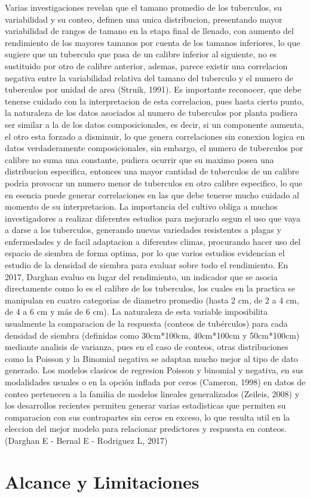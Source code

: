 Varias investigaciones revelan que el tamano promedio de los tuberculos, su variabilidad y su conteo, definen una unica distribucion, presentando mayor variabilidad de rangos de tamano en la etapa final de llenado, con aumento del rendimiento de los mayores tamanos por cuenta de los tamanos inferiores, lo que sugiere que un tuberculo que pasa de un calibre inferior al siguiente, no es sustituido por otro de calibre anterior, ademas, parece existir una correlacion negativa entre la variabilidad relativa del tamano del tuberculo y el numero de tuberculos por unidad de area (Struik, 1991). Es importante reconocer, que debe tenerse cuidado con la interpretacion de esta correlacion, pues hasta cierto punto, la naturaleza de los datos asociados al numero de tuberculos por planta pudiera ser similar a la de los datos composicionales, es decir, si un componente aumenta, el otro esta forzado a disminuir, lo que genera correlaciones sin conexion logica en datos verdaderamente composicionales, sin embargo, el numero de tuberculos por calibre no suma una constante, pudiera ocurrir que su maximo posea una distribucion especifica, entonces una mayor cantidad de tuberculos de un calibre podria provocar un numero menor de tuberculos en otro calibre especifico, lo que en esencia puede generar correlaciones en las que debe tenerse mucho cuidado al momento de su interpretacion. La importancia del cultivo obliga a muchos investigadores a realizar diferentes estudios para mejorarlo segun el uso que vaya a darse a los tuberculos, generando nuevas variedades resistentes a plagas y enfermedades y de facil adaptacion a diferentes climas, procurando hacer uso del espacio de siembra de forma optima, por lo que varios estudios evidencian el estudio de la densidad de siembra para evaluar sobre todo el rendimiento. En 2017, Darghan evaluo en lugar del rendimiento, un indicador que se asocia directamente como lo es el calibre de los tuberculos, los cuales en la practica se manipulan en cuatro categorias de diametro promedio (hasta 2 cm, de 2 a 4 cm, de 4 a 6 cm y más de 6 cm). La naturaleza de esta variable imposibilita usualmente la comparacion de la respuesta (conteos de tubérculos) para cada densidad de siembra (definidas como 30cm*100cm, 40cm*100cm y 50cm*100cm) mediante analisis de varianza, pues en el caso de conteos, otras distribuciones como la Poisson y la Binomial negativa se adaptan mucho mejor al tipo de dato generado. Los modelos clasicos de regresion Poisson y binomial y negativa, en sus modalidades usuales o en la opción inflada por ceros (Cameron, 1998) en datos de conteo pertenecen a la familia de modelos lineales generalizados (Zeileis, 2008) y los desarrollos recientes permiten generar varias estadisticas que permiten su comparacion con sus contrapartes sin ceros en exceso, lo que resulta util en la eleccion del mejor modelo para relacionar predictores y respuesta en conteos. (Darghan E - Bernal E - Rodriguez L, 2017)\\



\section{Alcance y Limitaciones}

